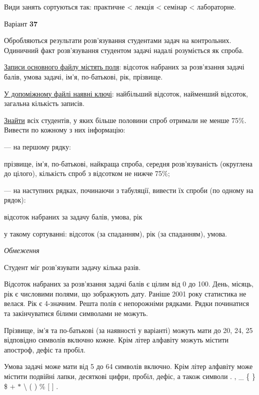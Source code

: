 \documentclass[11pt, ukrainian]{article}
\begin{document}
Види занять сортуються так: практичне < лекція < семінар < лабораторне.





\par
\newpage
{\center Варіант  \No \textbf { 37 }\par}
\bigskip
Обробляються результати розв’язування студентами задач на контрольних.
Одиничний факт роз\-в’я\-зу\-вання студентом задачі надалі розуміється як спроба.

\underline{Записи основного файлу містять поля}: відсоток набраних за розв’язання задачі балів, умова задачі, ім’я, по-батькові, рік, прізвище.

\underline{У допоміжному файлі наявні ключі}: найбільший відсоток, найменший відсоток, загальна кількість записів.

\underline{Знайти} всіх студентів, у яких більше половини спроб отримали не менше 75\%. Вивести по кожному з них інформацію:\par
{\noindent}--- на першому рядку:\par
прізвище, ім’я, по-батькові, найкраща спроба, середня розв’язуваність (округлена до цілого), кількість спроб з відсотком не нижче 75\%;

{\noindent}--- на наступних рядках, починаючи з табуляції, вивести їх спроби (по одному на рядок):\par
відсоток набраних за задачу балів, умова, рік

{\noindent}у такому сортуванні: відсоток (за спаданням), рік (за спаданням), умова.


\bigskip\textit{Обмеження}

Студент міг розв’язувати задачу кілька разів.

Відсоток набраних за розв’язання задачі балів є цілим від 0 до 100.
День, місяць, рік є числовими полями, що зображують дату.
Раніше 2001 року статистика не велася. Рік є 4-значним.
Решта полів є непорожніми рядками.
Рядки починатися та закінчуватися білими символами не можуть.

Прізвище, ім’я та по-батькові (за наявності у варіанті) можуть мати до 20, 24, 25 відповідно символів включно кожне. 
Крім літер алфавіту можуть містити апостроф, дефіс та пробіл.

Умова задачі може мати від 5 до 64 символів включно.
Крім літер алфавіту може містити подвійні лапки, десяткові цифри, пробіл, дефіс,
а також символи . , \_ \{ \} \$ $+$ $*$ {\textbackslash} ( ) \% $[$ $]$ .
\end{document}
